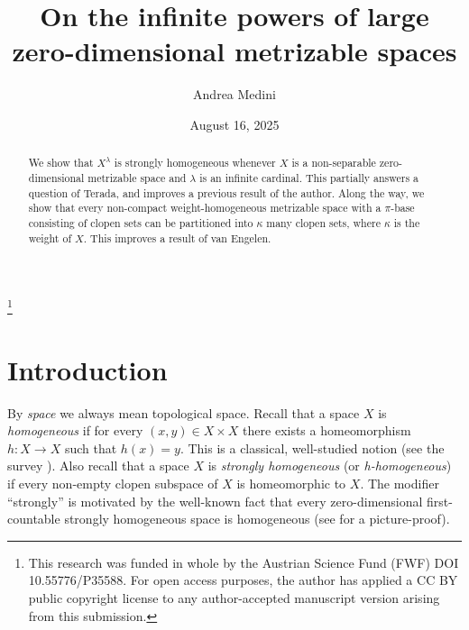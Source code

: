 \documentclass{amsart}
\theoremstyle{plain}
\theoremstyle{definition}
\begin{document}
\title{On the infinite powers of large zero-dimensional metrizable spaces}


\author{Andrea Medini}
\address{Institut f\"{u}r Diskrete Mathematik und Geometrie
\newline\indent Technische Universit\"{a}t Wien
\newline\indent  Wiedner Hauptstra\ss e 8–-10/104
\newline{} Vienna, Austria}



\thanks{This research was funded in whole by the Austrian Science Fund (FWF) DOI 10.55776/P35588. For open access purposes, the author has applied a CC BY public copyright license to any author-accepted manuscript version arising from this submission.}

\date{August 16, 2025}

\begin{abstract}
We show that $X^\lambda$ is strongly homogeneous whenever $X$ is a non-separable zero-dimensional metrizable space and $\lambda$ is an infinite cardinal. This partially answers a question of Terada, and improves a previous result of the author. Along the way, we show that every non-compact weight-homogeneous metrizable space with a $\pi$-base consisting of clopen sets can be partitioned into $\kappa$ many clopen sets, where $\kappa$ is the weight of $X$. This improves a result of van Engelen.
\end{abstract}

\maketitle

\tableofcontents

\section{Introduction}

By \emph{space} we always mean topological space. Recall that a space $X$ is \emph{homogeneous} if for every $(x,y)\in X\times X$ there exists a homeomorphism $h:X\longrightarrow X$ such that $h(x)=y$. This is a classical, well-studied notion (see the survey \cite{arhangelskii_van_mill}). Also recall that a space $X$ is \emph{strongly homogeneous} (or \emph{h-homogeneous}) if every non-empty clopen subspace of $X$ is homeomorphic to $X$. The modifier ``strongly'' is motivated by the well-known fact that every zero-dimensional first-countable strongly homogeneous space is homogeneous (see \cite[Proposition 3.32]{medini_thesis} for a picture-proof).
\end{document}
